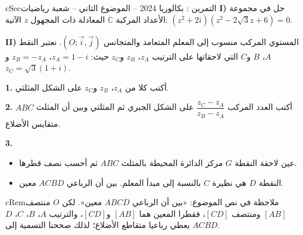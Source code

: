 \documentclass[12pt,a4paper]{article}
\newenvironment{BOX}[2]{\begin{otherlanguage}{english}\begin{arbox}{#1}{#2}}{\end{arbox}\end{otherlanguage}}
\newenvironment{molahada}[1][ملاحظة]{\begin{BOX}{cRem}{#1}}{\end{BOX}}
\newcounter{exo}
\newenvironment{tamrin}[1]{\stepcounter{exo}\begin{BOX}{cSec}{التمرين \theexo: #1}}{\end{BOX}}
\newenvironment{sq}{\begin{itemize}[leftmargin=2.4em,itemsep=3pt]}{\end{itemize}}
\newcommand{\qa}{\item[(أ)]}\newcommand{\qb}{\item[(ب)]}\newcommand{\qc}{\item[(جـ)]}\newcommand{\qd}{\item[(د)]}\newcommand{\qe}{\item[(هـ)]}
\newcommand{\QQ}[1]{\par\smallskip\textbf{#1.} }
\begin{document}
\begin{tamrin}{بكالوريا 2024 -- الموضوع الثاني -- شعبة رياضيات}
\textbf{I)} حل في مجموعة الأعداد المركبة $\mathbb{C}$ المعادلة ذات المجهول $z$ الآتية: $\left(z^2+2i\right)\left(z^2-2\sqrt3z+6\right)=0$.

\textbf{II)} المستوي المركب منسوب إلى المعلم المتعامد والمتجانس $\left(O;\vec i,\vec j\right)$.
نعتبر النقط $A$، $B$ و$C$ التي لاحقاتها على الترتيب $z_A$، $z_B$ و$z_C$ حيث: $z_A=1-i$، $z_B=-z_A$ و$z_C=\sqrt3(1+i)$.

\QQ{1} أكتب كلا من $z_A$، $z_B$ و$z_C$ على الشكل المثلثي.

\QQ{2} أكتب العدد المركب $\dfrac{z_C-z_A}{z_B-z_A}$ على الشكل الجبري ثم المثلثي وبين أن المثلث $ABC$ متقايس الأضلاع.

\QQ{3}
\begin{sq}
\qa عين لاحقة النقطة $G$ مركز الدائرة المحيطة بالمثلث $ABC$ ثم أحسب نصف قطرها.
\qb النقطة $D$ هي نظيرة $C$ بالنسبة إلى مبدأ المعلم. بين أن الرباعي $ACBD$ معين.
\end{sq}
\end{tamrin}
\begin{molahada}
في نص الموضوع: «بين أن الرباعي $ABCD$ معين». لكن $O$ منتصف $[AB]$ ومنتصف $[CD]$، فقطرا المعين هما $[AB]$ و$[CD]$، والترتيب $A$، $B$، $C$، $D$ يعطي رباعيا متقاطع الأضلاع؛ لذلك صححنا التسمية إلى $ACBD$.
\end{molahada}
\end{document}
